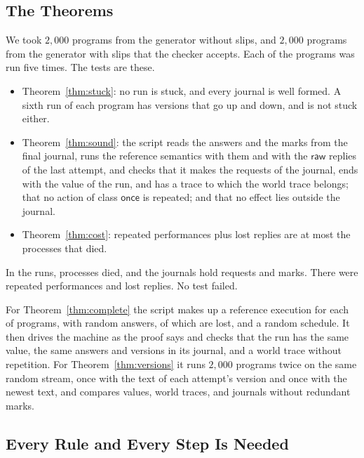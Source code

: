 \documentclass[acmsmall,nonacm,screen]{acmart}
\newcommand{\kw}[1]{\mathsf{#1}}
\newcommand{\onceclass}{\kw{once}}
\begin{document}
\subsection{The Theorems}

We took $2{,}000$ programs from the generator without slips, and $2{,}000$ programs from the
generator with slips that the checker accepts. Each of the \exPrograms{} programs was run five
times. The tests are these.
\begin{itemize}
\item Theorem~\ref{thm:stuck}: no run is stuck, and every journal is well formed. A sixth run
  of each program has versions that go up and down, and is not stuck either.
\item Theorem~\ref{thm:sound}: the script reads the answers and the marks from the final
  journal, runs the reference semantics with them and with the $\kw{raw}$ replies of the last
  attempt, and checks that it makes the requests of the journal, ends with the value of the
  run, and has a trace to which the world trace belongs; that no action of class
  $\onceclass$ is repeated; and that no effect lies outside the journal.
\item Theorem~\ref{thm:cost}: repeated performances plus lost replies are at most the
  processes that died.
\end{itemize}
In the \exRuns{} runs, \exCrashes{} processes died, and the journals hold \exRequests{}
requests and \exMarks{} marks. There were \exRepeats{} repeated performances and \exLost{}
lost replies. No test failed.

For Theorem~\ref{thm:complete} the script makes up a reference execution for each of
\exReferences{} programs, with random answers, of which \exRefLost{} are lost, and a random
schedule. It then drives the machine as the proof says and checks that the run has the same
value, the same answers and versions in its journal, and a world trace without repetition.
For Theorem~\ref{thm:versions} it runs $2{,}000$ programs twice on the same random stream,
once with the text of each attempt's version and once with the newest text, and compares
values, world traces, and journals without redundant marks.

\subsection{Every Rule and Every Step Is Needed}
\label{sec:needed}
\end{document}
